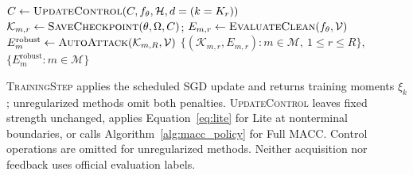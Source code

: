 \documentclass[a4paper,fleqn]{cas-dc}
\begin{document}
\begin{algorithm*}[p]
\begin{algorithmic}[1]
                \State $C\gets\Call{UpdateControl}{C,f_\theta,\mathcal H,d=(k=K_r)}$
            \EndIf
        \EndFor
        \State $\mathcal K_{m,r}\gets\Call{SaveCheckpoint}{\theta,\Omega,C}$;
            $E_{m,r}\gets\Call{EvaluateClean}{f_\theta,\mathcal V}$
    \EndFor
    \State $E_m^{\mathrm{robust}}\gets\Call{AutoAttack}{\mathcal K_{m,R},\mathcal V}$
\EndFor
\State \Return $\{(\mathcal K_{m,r},E_{m,r}):m\in\mathcal M,\ 1\le r\le R\}$,
    $\{E_m^{\mathrm{robust}}:m\in\mathcal M\}$
\end{algorithmic}
\vspace{2pt}
\noindent\footnotesize
\textsc{TrainingStep} applies the scheduled SGD update and returns training
moments $\xi_k$; unregularized methods omit both penalties.
\textsc{UpdateControl} leaves fixed strength unchanged, applies
Equation~\eqref{eq:lite} for Lite at nonterminal boundaries, or calls
Algorithm~\ref{alg:macc_policy} for Full MACC. Control operations are omitted
for unregularized methods. Neither acquisition nor feedback uses official
evaluation labels.
\end{algorithm*}
\end{document}
